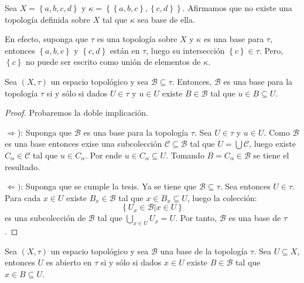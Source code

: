 \documentclass[12pt]{report}
\theoremstyle{largebreak}
\begin{document}
    \begin{exa}
        Sea $X=\left\{a,b,c,d\right\}$ y $\kappa=\left\{\left\{a,b,c\right\}, \left\{c,d\right\} \right\}$. Afirmamos que no existe una topología definida sobre $X$ tal que $\kappa$ sea base de ella.

        En efecto, suponga que $\tau$ es una topología sobre $X$ y $\kappa$ es una base para $\tau$, entonces $\left\{a,b,c\right\}$ y $\left\{c,d\right\}$ están en $\tau$, luego su intersección $\left\{c\right\}\in\tau$. Pero, $\left\{c\right\}$ no puede ser escrito como unión de elementos de $\kappa$.
    \end{exa}

    \begin{propo}
        Sea $(X,\tau)$ un espacio topológico y sea $\mathcal{B}\subseteq\tau$. Entonces, $\mathcal{B}$ es una base para la topología $\tau$ si y sólo si dados $U\in \tau$ y $u\in U$ existe $B\in\mathcal{B}$ tal que $u\in B\subseteq U$.
    \end{propo}

    \begin{proof}
        Probaremos la doble implicación.

        $\Rightarrow$): Suponga que $\mathcal{B}$ es una base para la topología $\tau$. Sea $U\in \tau$ y $u\in U$. Como $\mathcal{B}$ es una base entonces exise una subcolección $\mathcal{C}\subseteq\mathcal{B}$ tal que $U=\bigcup\mathcal{C}$, luego existe $C_\alpha\in\mathcal{C}$ tal que $u\in C_\alpha$. Por ende $u\in C_\alpha\subseteq U$. Tomando $B=C_\alpha\in\mathcal{B}$ se tiene el resultado.

        $\Leftarrow)$: Suponga que se cumple la tesis. Ya se tiene que $\mathcal{B}\subseteq\tau$. Sea entonces $U\in\tau$. Para cada $x\in U$ existe $B_x\in\mathcal{B}$ tal que $x\in B_x\subseteq U$, luego la colección:
        \begin{equation*}
            \left\{U_x\in\mathcal{B}\big| x\in U \right\}
        \end{equation*}
        es una subcolección de $\mathcal{B}$ tal que $\bigcup_{x\in U}U_x=U$. Por tanto, $\mathcal{B}$ es una base de $\tau$.
    \end{proof}

    \begin{cor}
        Sea $(X,\tau)$ un espacio topológico y sea $\mathcal{B}$ una base de la topología $\tau$. Sea $U\subseteq X$, entonces $U$ es abierto en $\tau$ si y sólo si dados $x\in U$ existe $B\in\mathcal{B}$ tal que $x\in B\subseteq U$.
    \end{cor}
\end{document}
